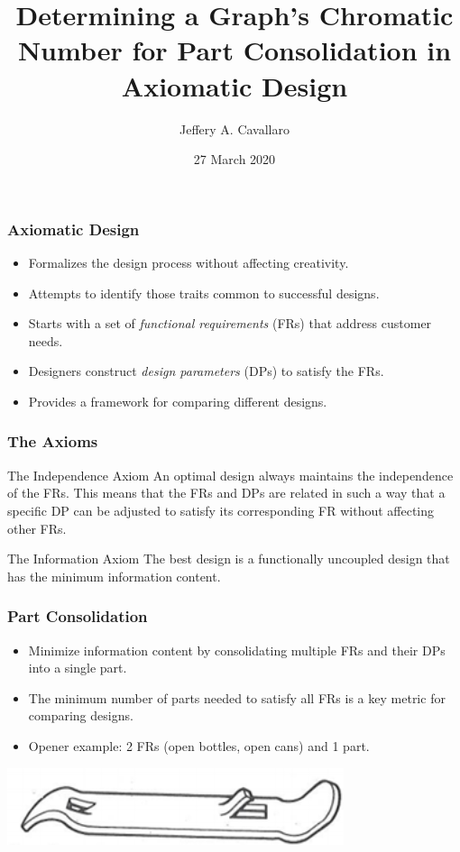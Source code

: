 \documentclass{beamer}
\title{Determining a Graph's Chromatic Number for Part Consolidation in Axiomatic Design}
\author{Jeffery A. Cavallaro}
\institute{San Jose State University \\ Department of Mathematics}
\date{27 March 2020}
\begin{document}
\frame{\titlepage}

\begin{frame}
  \frametitle{Axiomatic Design}
  \begin{itemize}
  \item Formalizes the design process without affecting creativity.
  \item Attempts to identify those traits common to successful designs.
  \item Starts with a set of \emph{functional requirements} (FRs) that address customer needs.
  \item Designers construct \emph{design parameters} (DPs) to satisfy the FRs.
  \item Provides a framework for comparing different designs.
  \end{itemize}
\end{frame}

\begin{frame}
  \frametitle{The Axioms}
  \begin{block}{The Independence Axiom}
    An optimal design always maintains the independence of the FRs. This means that the FRs and DPs are related in
    such a way that a specific DP can be adjusted to satisfy its corresponding FR without affecting other FRs.
  \end{block}
  \begin{block}{The Information Axiom}
    The best design is a functionally uncoupled design that has the minimum information content.
  \end{block}
\end{frame}

\begin{frame}
  \frametitle{Part Consolidation}
  \begin{itemize}
  \item Minimize information content by consolidating multiple FRs and their DPs into a single part.
  \item The minimum number of parts needed to satisfy all FRs is a key metric for comparing designs.
  \item Opener example: 2 FRs (open bottles, open cans) and 1 part.
  \end{itemize}

  \begin{center}
    \includegraphics[scale=0.5]{opener}
  \end{center}
\end{frame}
\end{document}
